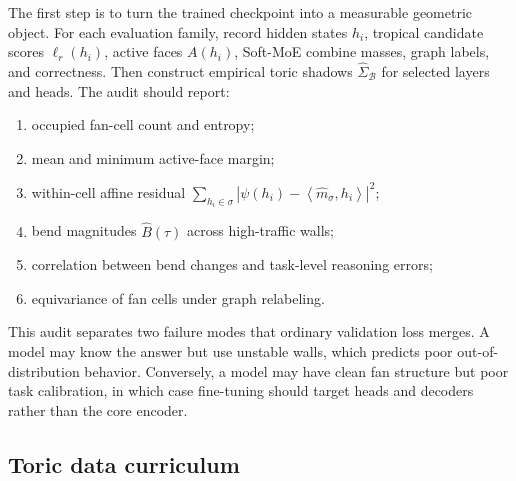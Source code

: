 \documentclass[11pt]{article}
\theoremstyle{definition}
\theoremstyle{plain}
\theoremstyle{remark}
\numberwithin{equation}{section}
\newcommand{\abs}[1]{\left\lvert #1\right\rvert}
\newcommand{\ip}[2]{\left\langle #1,#2\right\rangle}
\begin{document}
The first step is to turn the trained checkpoint into a measurable geometric object.  For each evaluation family, record hidden states $h_i$, tropical candidate scores $\ell_r(h_i)$, active faces $A(h_i)$, Soft-MoE combine masses, graph labels, and correctness.  Then construct empirical toric shadows $\widehat\Sigma_{\mathcal B}$ for selected layers and heads.  The audit should report:
\begin{enumerate}[leftmargin=2em]
  \item occupied fan-cell count and entropy;
  \item mean and minimum active-face margin;
  \item within-cell affine residual $\sum_{h_i\in\sigma}\abs{\psi(h_i)-\ip{\widehat m_\sigma}{h_i}}^2$;
  \item bend magnitudes $\widehat B(\tau)$ across high-traffic walls;
  \item correlation between bend changes and task-level reasoning errors;
  \item equivariance of fan cells under graph relabeling.
\end{enumerate}
This audit separates two failure modes that ordinary validation loss merges.  A model may know the answer but use unstable walls, which predicts poor out-of-distribution behavior.  Conversely, a model may have clean fan structure but poor task calibration, in which case fine-tuning should target heads and decoders rather than the core encoder.

\subsection{Toric data curriculum}
\end{document}
